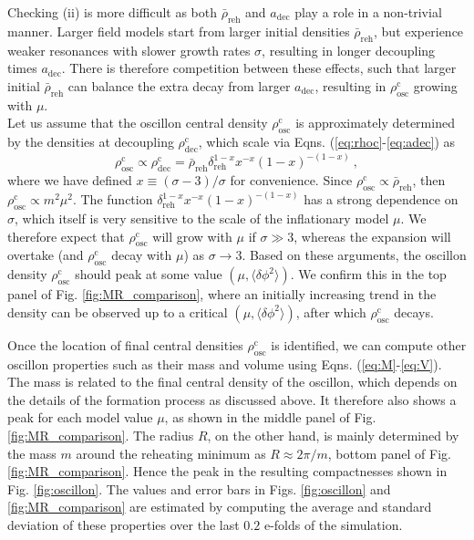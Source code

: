 \documentclass[
    reprint,
    preprintnumbers,
    superscriptaddress,
    nofootinbib,
     amsmath,amssymb,
     aps,
     prd,
    floatfix,
    ]{revtex4-2}
\newcommand{\reh}{_\mathrm{reh}}
\newcommand{\rhocdec}{\rho^\mathrm{c}_\mathrm{dec}}
\newcommand{\rhocosc}{\rho^\mathrm{c}_\mathrm{osc}}
\newcommand{\adec}{a_\mathrm{dec}}
\newcommand{\deltaini}{\delta_\mathrm{reh}}
\newcommand{\rhorehav}{\bar{\rho}_\mathrm{reh}}
\begin{document}
Checking (ii) is more difficult as both $\bar{\rho}\reh$ and $\adec$ play a role in a non-trivial manner.  Larger field models start from larger initial densities $\rhorehav$, but experience weaker resonances with slower growth rates $\sigma$, resulting in longer decoupling times $\adec$. There is therefore competition between these effects, such that larger initial $\rhorehav$ can balance the extra decay from larger $\adec$, resulting in $\rhocosc$ growing with  $\mu$.\\

Let us assume that the oscillon central density $\rhocosc$ is approximately determined by the densities at decoupling $\rhocdec$, which scale via Eqns. (\ref{eq:rhoc}-\ref{eq:adec}) as
\begin{equation}
    \rhocosc\propto \rhocdec=\rhorehav \deltaini^{1-x} x^{-x} (1-x)^{-(1-x)} ~,
\end{equation}
where we have defined $x\equiv (\sigma-3)/\sigma$ for convenience. Since $\rhocosc\propto \rhorehav$, then $\rhocosc\propto m^2\mu^2$. The function $\deltaini^{1-x}x^{-x}(1-x)^{-(1-x)}$ has a strong dependence on $\sigma$, which itself is very sensitive to the scale of the inflationary model $\mu$. We therefore expect that $\rhocosc$ will grow with $\mu$ if $\sigma \gg 3$, whereas the expansion will overtake (and $\rhocosc$ decay with $\mu$) as $\sigma\rightarrow 3$. Based on these arguments, the oscillon density $\rhocosc$ should peak at some value $(\mu,\langle \delta\phi^2 \rangle)$. We confirm this in the top panel of  Fig. \ref{fig:MR_comparison}, where an initially increasing trend in the density can be observed up to  a critical $(\mu,\langle \delta\phi^2 \rangle)$, after which $\rhocosc$ decays.

Once the location of final central densities $\rhocosc$ is identified, we can compute other oscillon properties such as their mass and volume using Eqns. (\ref{eq:M}-\ref{eq:V}). The mass is related to the final central density of the oscillon, which depends on the details of the formation process as discussed above. It therefore also shows a peak for each model value $\mu$, as shown in the middle panel of Fig. \ref{fig:MR_comparison}. The radius $R$, on the other hand, is mainly determined by the mass $m$ around the reheating minimum 
as $R\approx 2\pi /m$, bottom panel of Fig. \ref{fig:MR_comparison}. Hence the peak in the resulting compactnesses shown in Fig. \ref{fig:oscillon}. The values and error bars in Figs. \ref{fig:oscillon} and \ref{fig:MR_comparison} are estimated by computing the average and standard deviation of these properties over the last $0.2$ e-folds of the simulation.
\end{document}
